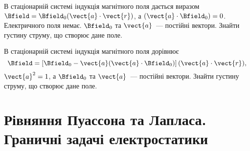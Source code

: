 \begin{problem}
В стаціонарній системі індукція магнітного поля дається виразом $\Bfield = \Bfield_0 (\vect{a}\cdot \vect{r})$, а $(\vect{a}\cdot \Bfield_0) = 0$.  Електричного поля немає. $\Bfield_0$ та $\vect{a}$~--- постійні вектори. Знайти густину струму, що створює дане поле.
\end{problem}

\begin{problem}
В стаціонарній системі індукція магнітного поля дорівнює
\[
	\Bfield = \left[ \Bfield_0 - \vect{a}(\vect{a} \cdot \Bfield_0)\right]  (\vect{a}\cdot \vect{r}),
\]
$\vect{a}^2 = 1$, а $\Bfield_0$ та $\vect{a}$~--- постійні вектори. Знайти густину струму, що створює дане поле.
\end{problem}

\section{Рівняння Пуассона та Лапласа. Граничні задачі електростатики}

